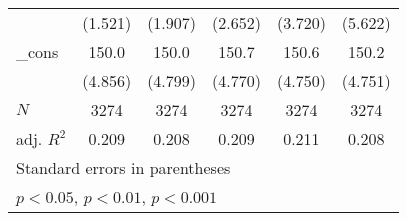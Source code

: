 {\begin{tabular}{l*{5}{c}}
            &     (1.521)         &     (1.907)         &     (2.652)         &     (3.720)         &     (5.622)         \\
[1em]
\_cons      &       150.0\sym{***}&       150.0\sym{***}&       150.7\sym{***}&       150.6\sym{***}&       150.2\sym{***}\\
            &     (4.856)         &     (4.799)         &     (4.770)         &     (4.750)         &     (4.751)         \\
\hline
\(N\)       &        3274         &        3274         &        3274         &        3274         &        3274         \\
adj. \(R^{2}\)&       0.209         &       0.208         &       0.209         &       0.211         &       0.208         \\
\hline\hline
\multicolumn{6}{l}{\footnotesize Standard errors in parentheses}\\
\multicolumn{6}{l}{\footnotesize \sym{*} \(p<0.05\), \sym{**} \(p<0.01\), \sym{***} \(p<0.001\)}\\
\end{tabular}
}
